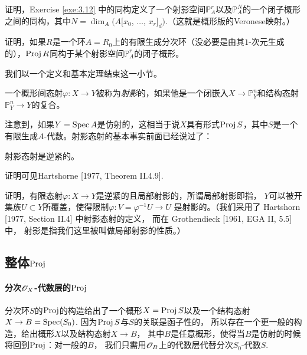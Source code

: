 \begin{exe}\label{exe:3.17}
证明，Exercise \ref{exe:3.12} 中的同构定义了一个射影空间$\mathbb P_A^r$以及$\mathbb P_A^N$的一个闭子概形之间的同构，其中$N=\dim_A(A[x_0$, $\dots$, $x_r]_d)$.（这就是概形版的Veronese映射。）
\end{exe}

\begin{exe}\label{exe:3.18}
证明，如果$R$是一个环$A=R_0$上的有限生成分次环（没必要是由其$1$-次元生成的），$\operatorname{Proj} R$同构于某个射影空间$\mathbb P_A^r$的闭子概形。
\end{exe}

我们以一个定义和基本定理结束这一小节。

\begin{defi}
一个概形间态射$\varphi:X\to Y$被称为\textit{射影}的，如果他是一个闭嵌入$X\to \mathbb P_Y^n$和结构态射$\mathbb P_Y^n\to Y$的复合。
\end{defi}

注意到，如果$Y=\operatorname{Spec} A$是仿射的，这相当于说$X$具有形式$\operatorname{Proj} S$，其中$S$是一个有限生成$A$-代数。射影态射的基本事实前面已经说过了：

\begin{thm}\label{thm:3.20}
射影态射是逆紧的。
\end{thm}

证明可见Hartshorne [1977, Theorem II.4.9].

\begin{exe}\label{exe:3.21}
证明，有限态射$\varphi:X\to Y$是逆紧的且局部射影的，所谓局部射影即指，
$Y$可以被开集族$U\subset Y$所覆盖，使得限制$\varphi:V=\varphi^{-1}U\to U$
是射影的。（我们采用了 Hartshorn [1977, Section II.4] 中射影态射的定义，
而在 Grothendieck [1961, EGA II, 5.5] 中，
射影是指我们这里被叫做局部射影的性质。）
\end{exe}

\subsection{整体\texorpdfstring{$\operatorname{Proj}$}{Proj}} \label{s:3.2.3}

\paragraph*{分次\texorpdfstring{$\mathscr{O}_X$}{OX}-代数层的\texorpdfstring{$\operatorname{Proj}$}{Proj}}
分次环$S$的$\operatorname{Proj}$的构造给出了一个概形$X=\operatorname{Proj} S$以及一个结构态射
$X\to B=\operatorname{Spec}(S_0)$. 因为$\operatorname{Proj} S$与$S$的关联是函子性的，
所以存在一个更一般的构造，给出概形$X$以及结构态射$X\to B$，
其中$B$是任意概形，使得当$B$是仿射的时候将回到$\operatorname{Proj}$：对一般的$B$，
我们只需用$\mathscr{O}_B$上的代数层代替分次$S_0$-代数$S$.

